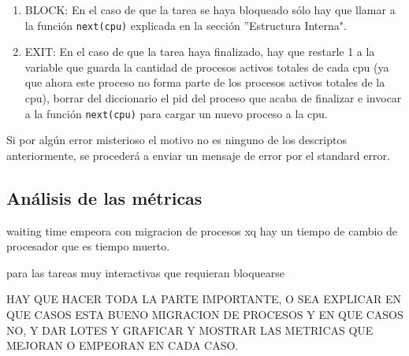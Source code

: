\begin{itemize}
\begin{enumerate}
		\item BLOCK: En el caso de que la tarea se haya bloqueado s\'olo hay que llamar a la funci\'on \texttt{next(cpu)} explicada en la secci\'on ''Estructura Interna".
		\item EXIT: En el caso de que la tarea haya finalizado, hay que restarle 1 a la variable que guarda la cantidad de procesos activos totales de cada cpu (ya que ahora este proceso no forma parte de los procesos activos totales de la cpu), borrar del diccionario el pid del proceso que acaba de finalizar e invocar a la funci\'on \texttt{next(cpu)} para cargar un nuevo proceso a la cpu.
	\end{enumerate}
	Si por alg\'un error misterioso el motivo no es ninguno de los descriptos anteriormente, se proceder\'a a enviar un mensaje de error por el standard error.
\end{itemize}

\subsection{An\'alisis de las m\'etricas}

waiting time empeora con migracion de procesos xq hay un tiempo de cambio de procesador que es tiempo muerto.

para las tareas muy interactivas que requieran bloquearse 


HAY QUE HACER TODA LA PARTE IMPORTANTE, O SEA EXPLICAR EN QUE CASOS ESTA BUENO  MIGRACION DE PROCESOS Y EN QUE CASOS NO, Y DAR LOTES Y GRAFICAR Y MOSTRAR LAS METRICAS QUE MEJORAN O EMPEORAN EN CADA CASO.














